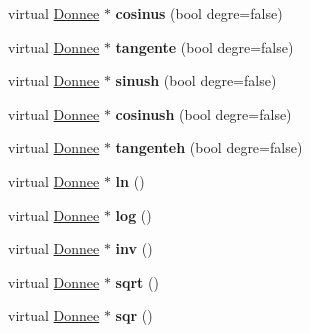 \begin{DoxyCompactItemize}
\item 
\hypertarget{class_donnee_a7acf23e9df7b283ee250979c45ffd552}{virtual \hyperlink{class_donnee}{Donnee} $\ast$ {\bfseries cosinus} (bool degre=false)}\label{class_donnee_a7acf23e9df7b283ee250979c45ffd552}

\item 
\hypertarget{class_donnee_ac33001ccfe52e44ddfcb2867b3237071}{virtual \hyperlink{class_donnee}{Donnee} $\ast$ {\bfseries tangente} (bool degre=false)}\label{class_donnee_ac33001ccfe52e44ddfcb2867b3237071}

\item 
\hypertarget{class_donnee_adf2596df9d32c19e4e11f14e427463a3}{virtual \hyperlink{class_donnee}{Donnee} $\ast$ {\bfseries sinush} (bool degre=false)}\label{class_donnee_adf2596df9d32c19e4e11f14e427463a3}

\item 
\hypertarget{class_donnee_aaf9c1fff535f07bbccacf9a84bf93c0f}{virtual \hyperlink{class_donnee}{Donnee} $\ast$ {\bfseries cosinush} (bool degre=false)}\label{class_donnee_aaf9c1fff535f07bbccacf9a84bf93c0f}

\item 
\hypertarget{class_donnee_a7e9b76d263322a608be941806141253f}{virtual \hyperlink{class_donnee}{Donnee} $\ast$ {\bfseries tangenteh} (bool degre=false)}\label{class_donnee_a7e9b76d263322a608be941806141253f}

\item 
\hypertarget{class_donnee_ae9d27263f4b2ef0db3cafe2c2dc5cb91}{virtual \hyperlink{class_donnee}{Donnee} $\ast$ {\bfseries ln} ()}\label{class_donnee_ae9d27263f4b2ef0db3cafe2c2dc5cb91}

\item 
\hypertarget{class_donnee_a9240a3498980483358186327a7f214f8}{virtual \hyperlink{class_donnee}{Donnee} $\ast$ {\bfseries log} ()}\label{class_donnee_a9240a3498980483358186327a7f214f8}

\item 
\hypertarget{class_donnee_a4d8949660f58c2a7504489773edc985c}{virtual \hyperlink{class_donnee}{Donnee} $\ast$ {\bfseries inv} ()}\label{class_donnee_a4d8949660f58c2a7504489773edc985c}

\item 
\hypertarget{class_donnee_a03b474f5f379b4b99c7c42aaa2d5eecd}{virtual \hyperlink{class_donnee}{Donnee} $\ast$ {\bfseries sqrt} ()}\label{class_donnee_a03b474f5f379b4b99c7c42aaa2d5eecd}

\item 
\hypertarget{class_donnee_a116e1c4326d5c6b938f90c9ad4ae26c3}{virtual \hyperlink{class_donnee}{Donnee} $\ast$ {\bfseries sqr} ()}\label{class_donnee_a116e1c4326d5c6b938f90c9ad4ae26c3}


\end{DoxyCompactItemize}
